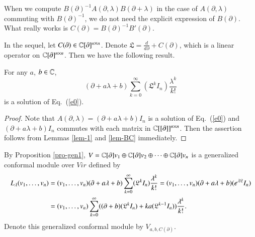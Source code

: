 \documentclass[12pt]{amsart}
\begin{document}
\begin{rmk}When we compute $B(\partial)^{-1}A(\partial,\lambda)B(\partial+\lambda)$ in the case of $A(\partial,\lambda)$ commuting with $B(\partial)^{-1}$, we do not need the explicit expression of $B(\partial)$. %
What really works is $C(\partial)=B(\partial)^{-1}B'(\partial)$.%
\end{rmk}

In the sequel, let $C(\partial)\in \mathbb{C}[\partial]^{n\times n}$. Denote $\mathfrak{L}=\frac{d}{d\partial}+C(\partial)$, which is a linear operator on $\mathbb{C}[\partial]^{n\times n}$. Then
we have the following result.
\begin{pro}\label{pro-gen1}
For any $a$, $b\in \mathbb{C}$,
$$(\partial+a \lambda+b)\sum_{k=0}^\infty (\mathfrak{L}^kI_n)\frac{\lambda^k}{k!}$$
is a solution of Eq.~(\ref{e0}).%
\end{pro}
\begin{proof}
Note that $A(\partial, \lambda)=(\partial+a\lambda+b)I_n$ is a solution of Eq.~(\ref{e0}) and $(\partial+a\lambda+b)I_n$ commutes with each matrix in $\mathbb{C}[[\partial]]^{n\times n}$. Then the assertion follows from Lemmas \ref{lem-1} and \ref{lem-BC} immediately. %
\end{proof}
By Proposition \ref{pro-gen1}, $V=\mathbb{C}[\partial]v_1\oplus \mathbb{C}[\partial]v_2\oplus \cdots \oplus \mathbb{C}[\partial]v_n$ is a generalized conformal module over $Vir$ defined by
\begin{eqnarray*}
\aligned
L_\lambda (v_1,\ldots, v_n)&=(v_1,\ldots, v_n)(\partial+a \lambda+b)\sum_{k=0}^\infty (\mathfrak{L}^kI_n)\frac{\lambda^k}{k!}=(v_1,\ldots, v_n)(\partial+a \lambda+b)(e^{\lambda\mathfrak{L}}I_n)\\
&=(v_1,\ldots, v_n)\sum_{k=0}^\infty ((\partial+b)(\mathfrak{L}^kI_n)+ka(\mathfrak{L}^{k-1}I_n))\frac{\lambda^k}{k!}
.
\endaligned
\end{eqnarray*}%
Denote this generalized conformal module by $V_{a,b,C(\partial)}$.
\end{document}

